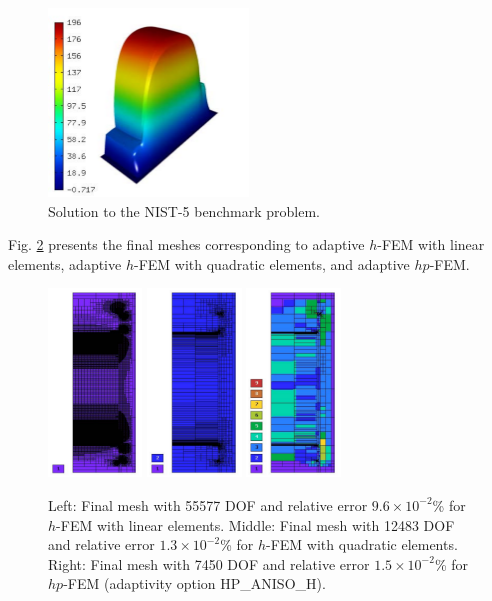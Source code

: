 \documentclass[12pt]{elsarticle}
\begin{document}
\begin{figure}[H]
\centering
\includegraphics[height=5cm]{mafig29.pdf}
\caption{Solution to the NIST-5 benchmark problem.}
\label{fig:sln-nist05}
\end{figure}

Fig. \ref{fig:nist-5-hp-aniso} presents the final meshes corresponding to adaptive $h$-FEM with
linear elements, adaptive $h$-FEM with quadratic elements, and adaptive $hp$-FEM.

\begin{figure}[H]
\centering
\includegraphics[height=5cm]{mafig30.pdf}
\includegraphics[height=5cm]{mafig31.pdf}
\includegraphics[height=5cm]{mafig32.pdf}
\caption{
Left: Final mesh with 55577 DOF and relative error $9.6\times10^{-2}$\% for $h$-FEM with linear elements.
Middle: Final mesh with 12483 DOF and relative error $1.3\times10^{-2}$\% for $h$-FEM with quadratic elements.
Right: Final mesh with 7450 DOF and relative error $1.5\times10^{-2}$\% for $hp$-FEM (adaptivity option HP\_ANISO\_H).}
\label{fig:nist-5-hp-aniso}
\end{figure}
\end{document}
